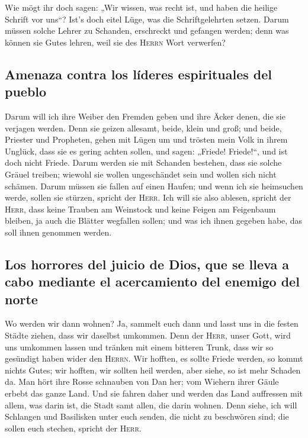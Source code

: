  Wie mögt ihr doch sagen: „Wir wissen, was recht ist, und
haben die heilige Schrift vor uns``? Ist's doch eitel Lüge, was die
Schriftgelehrten setzen.  Darum müssen solche Lehrer zu
Schanden, erschreckt und gefangen werden; denn was können sie Gutes
lehren, weil sie des \textsc{Herrn} Wort verwerfen?

\hypertarget{amenaza-contra-los-luxedderes-espirituales-del-pueblo}{%
\subsection{Amenaza contra los líderes espirituales del
pueblo}\label{amenaza-contra-los-luxedderes-espirituales-del-pueblo}}

 Darum will ich ihre Weiber den Fremden geben und ihre
Äcker denen, die sie verjagen werden. Denn sie geizen allesamt, beide,
klein und groß; und beide, Priester und Propheten, gehen mit Lügen um
 und trösten mein Volk in ihrem Unglück, dass sie es
gering achten sollen, und sagen: „Friede! Friede!{}``, und ist doch
nicht Friede.  Darum werden sie mit Schanden bestehen,
dass sie solche Gräuel treiben; wiewohl sie wollen ungeschändet sein und
wollen sich nicht schämen. Darum müssen sie fallen auf einen Haufen; und
wenn ich sie heimsuchen werde, sollen sie stürzen, spricht der
\textsc{Herr}.  Ich will sie also ablesen, spricht der
\textsc{Herr}, dass keine Trauben am Weinstock und keine Feigen am
Feigenbaum bleiben, ja auch die Blätter wegfallen sollen; und was ich
ihnen gegeben habe, das soll ihnen genommen werden.

\hypertarget{los-horrores-del-juicio-de-dios-que-se-lleva-a-cabo-mediante-el-acercamiento-del-enemigo-del-norte}{%
\subsection{Los horrores del juicio de Dios, que se lleva a cabo
mediante el acercamiento del enemigo del
norte}\label{los-horrores-del-juicio-de-dios-que-se-lleva-a-cabo-mediante-el-acercamiento-del-enemigo-del-norte}}

 Wo werden wir dann wohnen? Ja, sammelt euch dann und
lasst uns in die festen Städte ziehen, dass wir daselbst umkommen. Denn
der \textsc{Herr}, unser Gott, wird uns umkommen lassen und tränken mit
einem bitteren Trunk, dass wir so gesündigt haben wider den
\textsc{Herrn}.  Wir hofften, es sollte Friede werden, so
kommt nichts Gutes; wir hofften, wir sollten heil werden, aber siehe, so
ist mehr Schaden da.  Man hört ihre Rosse schnauben von
Dan her; vom Wiehern ihrer Gäule erbebt das ganze Land. Und sie fahren
daher und werden das Land auffressen mit allem, was darin ist, die Stadt
samt allen, die darin wohnen.  Denn siehe, ich will
Schlangen und Basilisken unter euch senden, die nicht zu beschwören
sind; die sollen euch stechen, spricht der \textsc{Herr}.

